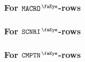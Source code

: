 \subsubsection{For $\isMxpMacro$-rows}         \label{mxp: constraints: generalities: macro}           
\subsubsection{For $\isMxpScenario$-rows}      \label{mxp: constraints: generalities: scenario}        
\subsubsection{For $\isMxpComputation$-rows}   \label{mxp: constraints: generalities: computation}     

